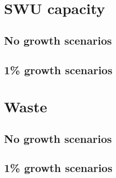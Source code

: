 \section{SWU capacity}
\subsection{No growth scenarios}

\subsection{1\% growth scenarios}

\section{Waste}
\subsection{No growth scenarios}

\subsection{1\% growth scenarios}